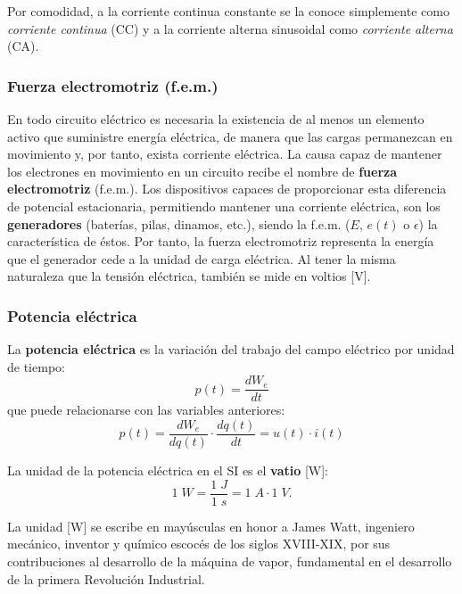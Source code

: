 	Por comodidad, a la corriente continua constante se la conoce simplemente como \textit{corriente continua} (CC) y a la corriente alterna sinusoidal como \textit{corriente alterna} (CA).
	
	
	\subsubsection{Fuerza electromotriz (f.e.m.)}
	En todo circuito eléctrico es necesaria la existencia de al menos un elemento activo que suministre energía eléctrica, de manera que las cargas permanezcan en movimiento y, por tanto, exista corriente eléctrica. La causa capaz de mantener los electrones en movimiento en un circuito recibe el nombre de \textbf{fuerza electromotriz} (f.e.m.). Los dispositivos capaces de proporcionar esta diferencia de potencial estacionaria, permitiendo mantener una corriente eléctrica, son los \textbf{generadores} (baterías, pilas, dinamos, etc.), siendo la f.e.m. ($E$, $e(t)$ o $\epsilon$) la característica de éstos.  Por tanto, la fuerza electromotriz representa la energía que el generador cede a la unidad de carga eléctrica. Al tener la misma naturaleza que la tensión eléctrica, también se mide en voltios [V]. 
	
	\subsubsection{Potencia eléctrica}
	La \textbf{potencia eléctrica} es la variación del trabajo del campo eléctrico por unidad de tiempo:
	\begin{equation*}
		p(t)=\frac{dW_{e}}{dt} 
	\end{equation*}
	que puede relacionarse con las variables anteriores:
	\begin{equation*}\label{eq.pvi}
		p(t) = \frac{dW_e}{dq(t)} \cdot \frac{dq(t)}{dt}= u(t)\cdot i(t)
	\end{equation*}
	
	La {unidad} de la potencia eléctrica en el SI es el \textbf{vatio} [W]: 
	\begin{equation*}
		1\;W = \dfrac{1\;J}{1\;s}= 1\;A\cdot 1\;V.
	\end{equation*}
	\begin{remark}
		La unidad [W] se escribe en mayúsculas en honor a James Watt, ingeniero mecánico, inventor y químico escocés de los siglos XVIII-XIX, por sus contribuciones al desarrollo de la máquina de vapor, fundamental en el desarrollo de la primera Revolución Industrial.
	\end{remark}
	

